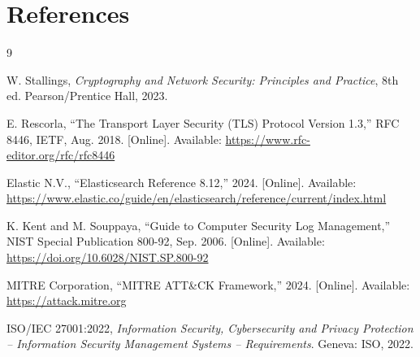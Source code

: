 \documentclass[12pt,a4paper]{report}
\begin{document}
\chapter*{References}

\begin{thebibliography}{9}

W. Stallings,
\textit{Cryptography and Network Security: Principles and Practice}, 8th ed.
Pearson/Prentice Hall, 2023.

E. Rescorla,
``The Transport Layer Security (TLS) Protocol Version 1.3,''
RFC 8446, IETF, Aug. 2018. [Online].
Available: \url{https://www.rfc-editor.org/rfc/rfc8446}

Elastic N.V.,
``Elasticsearch Reference 8.12,'' 2024. [Online].
Available: \url{https://www.elastic.co/guide/en/elasticsearch/reference/current/index.html}

K. Kent and M. Souppaya,
``Guide to Computer Security Log Management,''
NIST Special Publication 800-92, Sep. 2006. [Online].
Available: \url{https://doi.org/10.6028/NIST.SP.800-92}

MITRE Corporation,
``MITRE ATT\&CK Framework,'' 2024. [Online].
Available: \url{https://attack.mitre.org}

ISO/IEC 27001:2022,
\textit{Information Security, Cybersecurity and Privacy Protection --
Information Security Management Systems -- Requirements}.
Geneva: ISO, 2022.

\end{thebibliography}
\end{document}
